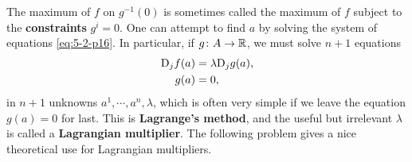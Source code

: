 \begin{problems}
{        The maximum of $f$ on $g^{-1}(0)$ is sometimes called the maximum of $f$ subject to the 
        \textbf{constraints} $g^i=0$. One can attempt to find $a$ by solving the system of equations \eqref{eq:5-2-p16}.
        In particular, if $g\colon{}A\to\mathbb{R}$, we must solve $n+1$ equations
        \begin{align*}
            \mathrm{D}_jf(a) & = \lambda\mathrm{D}_jg(a),\\
            g(a) & = 0,
        \end{align*}
        in $n+1$ unknowns $a^1,\cdots,a^n,\lambda$, which is often very simple if we 
        leave the equation $g(a)=0$ for last. This is \textbf{Lagrange's method}, and 
        the useful but irrelevant $\lambda$ is called a \textbf{Lagrangian multiplier}.
        The following problem gives a nice theoretical use for Lagrangian multipliers.
    }
\end{problems}